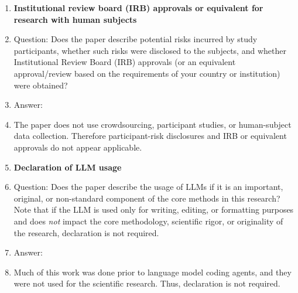 \begin{enumerate}
\item {\bf Institutional review board (IRB) approvals or equivalent for research with human subjects}
    \item[] Question: Does the paper describe potential risks incurred by study participants, whether such risks were disclosed to the subjects, and whether Institutional Review Board (IRB) approvals (or an equivalent approval/review based on the requirements of your country or institution) were obtained?
    \item[] Answer: \answerNA{}
    \item[] The paper does not use crowdsourcing, participant studies, or human-subject data collection. Therefore participant-risk disclosures and IRB or equivalent approvals do not appear applicable.

\item {\bf Declaration of LLM usage}
    \item[] Question: Does the paper describe the usage of LLMs if it is an important, original, or non-standard component of the core methods in this research? Note that if the LLM is used only for writing, editing, or formatting purposes and does \emph{not} impact the core methodology, scientific rigor, or originality of the research, declaration is not required.
    \item[] Answer: \answerNA{}
    \item[] Much of this work was done prior to language model coding agents, and they were not used for the scientific research. Thus, declaration is not required.

\end{enumerate}
